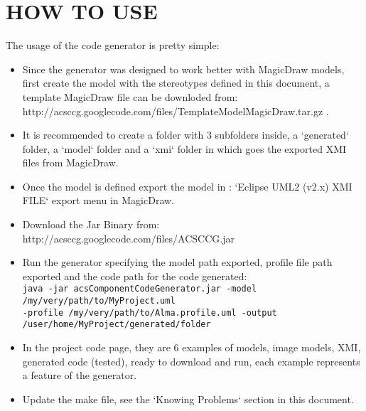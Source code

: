 \section{HOW TO USE}

The usage of the code generator is pretty simple:

\begin{itemize}
\item Since the generator was designed to work better with MagicDraw models,
first create the model with the stereotypes defined in this document, a template
MagicDraw file can be downloded from:\\
http://acsccg.googlecode.com/files/TemplateModelMagicDraw.tar.gz .
\item It is recommended to create a folder with 3 subfolders inside, a
`generated` folder, a `model` folder and a `xmi` folder in which goes the
exported XMI files from MagicDraw.
\item Once the model is defined export the model in : `Eclipse UML2 (v2.x) XMI
FILE` export menu in MagicDraw.
\item Download the Jar Binary from:\\
http://acsccg.googlecode.com/files/ACSCCG.jar
\item Run the generator specifying the model path exported, profile file path
exported and the code path for the code generated:\\ 
\verb+java -jar acsComponentCodeGenerator.jar -model /my/very/path/to/MyProject.uml+ \\
\verb+-profile /my/very/path/to/Alma.profile.uml -output+\\
\verb+/user/home/MyProject/generated/folder+\\
\item In the project code page, they are 6 examples of models, image models,
XMI, generated code (tested), ready to download and run, each example represents
a feature of the generator.
\item Update the make file, see the `Knowing Problems` section in this document.
\end{itemize}

